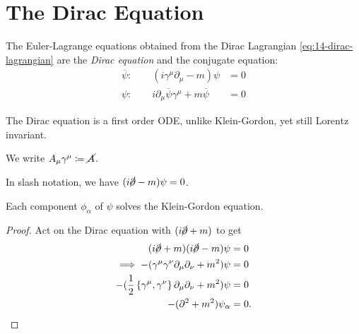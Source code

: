 \section{The Dirac Equation}%
\label{sec:the_dirac_equation}

The Euler-Lagrange equations obtained from the Dirac Lagrangian \eqref{eq:14-dirac-lagrangian} are the \emph{Dirac equation} and the conjugate equation:
\begin{align}
  \overline{\psi}\colon \qquad (i \gamma^{\mu} \partial_{\mu} - m) \psi &= 0 \\
  {\psi}\colon \qquad i \partial_{\mu} \overline{\psi} \gamma^{\mu} + m \overline{\psi} &= 0
\end{align}
\begin{leftbar}
  \begin{remark}
    The Dirac equation is a first order ODE, unlike Klein-Gordon, yet still Lorentz invariant.
  \end{remark}
\end{leftbar}
\begin{definition}
  We write $A_{\mu} \gamma^{\mu} \coloneqq \cancel{A}$.
\end{definition}
In slash notation, we have $(i \cancel{\partial} - m) \psi = 0$.

\begin{claim}
  Each component $\phi_{\alpha}$ of $\psi$ solves the Klein-Gordon equation.
\end{claim}
\begin{proof}
  Act on the Dirac equation with $(i \cancel{\partial} + m)$ to get
  \begin{align}
    (i \cancel{\partial} + m)(i \cancel{\partial} - m) \psi &= 0 \\
    \implies -(\gamma^{\mu} \gamma^{\nu} \partial_{\mu} \partial_{\nu} + m^2) \psi &= 0 \\
    - (\frac{1}{2} \left\{ \gamma^{\mu}, \gamma^{\nu} \right\} \partial_{\mu} \partial_{\nu} + m^2) \psi &= 0\\
    - (\partial^2 + m^2) \psi_{\alpha} &= 0.
  \end{align}
\end{proof}

